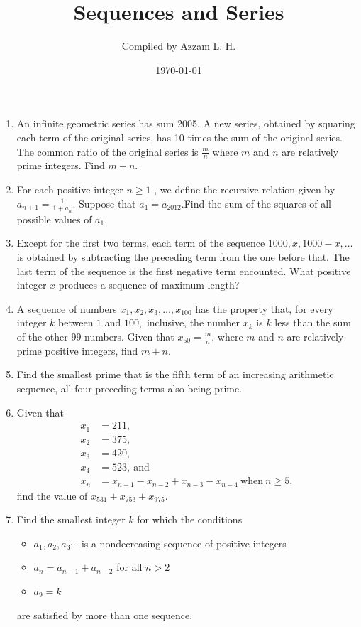 \documentclass[12pt]{scrartcl}
\title{Sequences and Series}
\author{Compiled by Azzam L. H.}
\date{\today}
\begin{document}
\maketitle

\renewcommand*\contentsname{Daftar Isi}
\tableofcontents

\newpage
 \begin{enumerate}
    \item An infinite geometric series has sum 2005. A new series, obtained by squaring each term of the original series, has 10 times the sum of the original series. The common ratio of the original series is $\frac mn$ where $m$ and $n$ are relatively prime integers. Find $m+n.$

    \item For each positive integer $n \geq 1$ , we define the recursive relation given by $a_{n+1} = \frac {1}{1+a_{n}}$. Suppose that $a_{1} = a_{2012}$.Find the sum of the squares of all possible values of $a_{1}$.

    \item Except for the first two terms, each term of the sequence $1000, x, 1000 - x,\ldots$ is obtained by subtracting the preceding term from the one before that. The last term of the sequence is the first negative term encounted. What positive integer $x$ produces a sequence of maximum length?

    \item A sequence of numbers $x_{1},x_{2},x_{3},\ldots,x_{100}$ has the property that, for every integer $k$ between $1$ and $100,$ inclusive, the number $x_{k}$ is $k$ less than the sum of the other $99$ numbers. Given that $x_{50} = \frac{m}{n}$, where $m$ and $n$ are relatively prime positive integers, find $m + n$.

    \item Find the smallest prime that is the fifth term of an increasing arithmetic sequence, all four preceding terms also being prime.

    \item Given that\begin{align*}x_{1}&=211,\\ x_{2}&=375,\\ x_{3}&=420,\\ x_{4}&=523,\ \text{and}\\ x_{n}&=x_{n-1}-x_{n-2}+x_{n-3}-x_{n-4}\ \text{when}\ n\geq5, \end{align*}find the value of $x_{531}+x_{753}+x_{975}$.

    \item Find the smallest integer $k$ for which the conditions
        \begin{itemize}
            \item $a_1,a_2,a_3\cdots$ is a nondecreasing sequence of positive integers
            \item $a_n=a_{n-1}+a_{n-2}$ for all $n>2$
            \item $a_9=k$
        \end{itemize}
    are satisfied by more than one sequence.


\end{enumerate}
\end{document}
